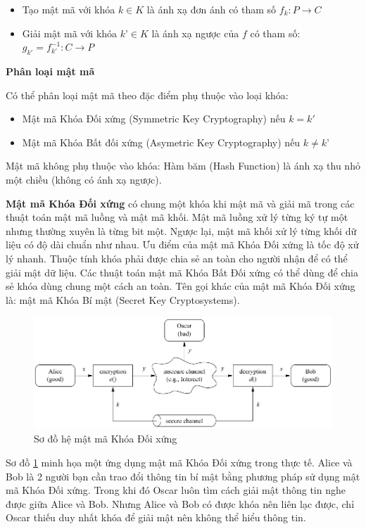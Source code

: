 \begin{itemize}
\item Tạo mật mã với khóa $k \in K $ là ánh xạ đơn ánh có tham số $f_k: P \to C$
\item Giải mật mã với khóa $k’ \in K $ là ánh xạ ngược của $f$ có tham số: $ g_{k'} = f_{k'}^{-1} : C \to P $
\end{itemize}

\textbf{Phân loại mật mã}

Có thể phân loại mật mã theo đặc điểm phụ thuộc vào loại khóa:

\begin{itemize}
\item Mật mã Khóa Đối xứng (Symmetric Key Cryptography) nếu $k=k'$
\item Mật mã Khóa Bất đối xứng (Asymetric Key Cryptography) nếu $k ≠ k’$
\end{itemize}

Mật mã không phụ thuộc vào khóa: Hàm băm (Hash Function) là ánh xạ thu nhỏ một chiều (không có ánh xạ ngược).

\textbf{Mật mã Khóa Đối xứng} có chung một khóa khi mật mã và giải mã trong các thuật toán mật mã luồng và mật mã khối. Mật mã luồng xử lý từng ký tự một nhưng thường xuyên là từng bit một. Ngược lại, mật mã khối xử lý từng khối dữ liệu có độ dài chuẩn như nhau. Ưu điểm của mật mã Khóa Đối xứng là tốc độ xử lý nhanh. Thuộc tính khóa phải được chia sẻ an toàn cho người nhận để có thể giải mật dữ liệu. Các thuật toán mật mã Khóa Bất Đối xứng có thể dùng để chia sẻ khóa dùng chung một cách an toàn. Tên gọi khác của mật mã Khóa Đối xứng là: mật mã Khóa Bí mật (Secret Key Cryptosystems).

\begin{figure}[htbp]
\centering
\includegraphics[width=.9\linewidth]{img/sym_alg.png}
\caption{Sơ đồ hệ mật mã Khóa Đối xứng}
\label{fig:sym_alg}
\end{figure}

Sơ đồ \ref{fig:sym_alg} minh họa một ứng dụng mật mã Khóa Đối xứng trong thực tế\cite{10.5555/1721909}. Alice và Bob là 2 người bạn cần trao đổi thông tin bí mật bằng phương pháp sử dụng mật mã Khóa Đối xứng. Trong khi đó Oscar luôn tìm cách giải mật thông tin nghe được giữa Alice và Bob. Nhưng Alice và Bob có được khóa nên liên lạc được, chỉ Oscar thiếu duy nhất khóa để giải mật nên không thể hiểu thông tin.

